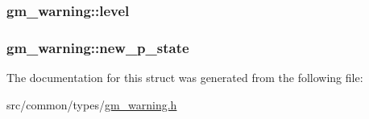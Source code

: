 \subsubsection[{\texorpdfstring{level}{level}}]{ gm\+\_\+warning\+::level}\hypertarget{structgm__warning_ab40ebdbfed4f2e27c96eee75d383e018}{}\label{structgm__warning_ab40ebdbfed4f2e27c96eee75d383e018}
\subsubsection[{\texorpdfstring{new\+\_\+p\+\_\+state}{new_p_state}}]{ gm\+\_\+warning\+::new\+\_\+p\+\_\+state}\hypertarget{structgm__warning_ab654751d95f0ea84589ada162d7d67fe}{}\label{structgm__warning_ab654751d95f0ea84589ada162d7d67fe}


The documentation for this struct was generated from the following file\+:\begin{DoxyCompactItemize}
\item 
src/common/types/\hyperlink{gm__warning_8h}{gm\+\_\+warning.\+h}\end{DoxyCompactItemize}
